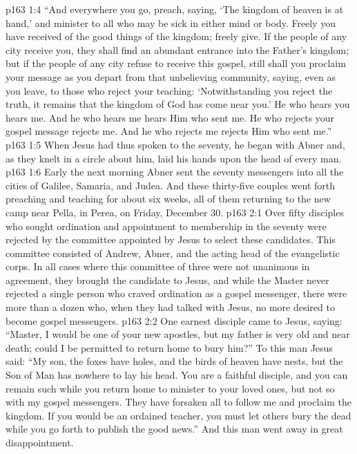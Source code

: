 \vs p163 1:4 \textcolor{ubdarkred}{“And everywhere you go, preach, saying, ‘The kingdom of heaven is at hand,’ and minister to all who may be sick in either mind or body. Freely you have received of the good things of the kingdom; freely give. If the people of any city receive you, they shall find an abundant entrance into the Father’s kingdom; but if the people of any city refuse to receive this gospel, still shall you proclaim your message as you depart from that unbelieving community, saying, even as you leave, to those who reject your teaching: ‘Notwithstanding you reject the truth, it remains that the kingdom of God has come near you.’ He who hears you hears me. And he who hears me hears Him who sent me. He who rejects your gospel message rejects me. And he who rejects me rejects Him who sent me.”}
\vs p163 1:5 When Jesus had thus spoken to the seventy, he began with Abner and, as they knelt in a circle about him, laid his hands upon the head of every man.
\vs p163 1:6 Early the next morning Abner sent the seventy messengers into all the cities of Galilee, Samaria, and Judea. And these thirty\hyp{}five couples went forth preaching and teaching for about six weeks, all of them returning to the new camp near Pella, in Perea, on Friday, December 30.
\vs p163 2:1 Over fifty disciples who sought ordination and appointment to membership in the seventy were rejected by the committee appointed by Jesus to select these candidates. This committee consisted of Andrew, Abner, and the acting head of the evangelistic corps. In all cases where this committee of three were not unanimous in agreement, they brought the candidate to Jesus, and while the Master never rejected a single person who craved ordination as a gospel messenger, there were more than a dozen who, when they had talked with Jesus, no more desired to become gospel messengers.
\pc \vs p163 2:2 One earnest disciple came to Jesus, saying: “Master, I would be one of your new apostles, but my father is very old and near death; could I be permitted to return home to bury him?” To this man Jesus said: \textcolor{ubdarkred}{“My son, the foxes have holes, and the birds of heaven have nests, but the Son of Man has nowhere to lay his head. You are a faithful disciple, and you can remain such while you return home to minister to your loved ones, but not so with my gospel messengers. They have forsaken all to follow me and proclaim the kingdom. If you would be an ordained teacher, you must let others bury the dead while you go forth to publish the good news.”} And this man went away in great disappointment.
